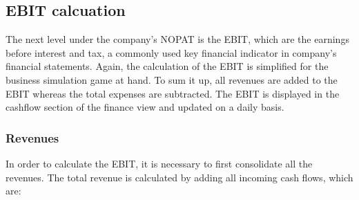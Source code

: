 \subsection{EBIT calcuation}

The next level under the company's NOPAT is the EBIT, which are the earnings before interest and tax, a commonly used key financial indicator in company's financial statements. \cite{lee_e_2006} Again, the calculation of the EBIT is simplified for the business simulation game at hand. To sum it up, all revenues are added to the EBIT whereas the total expenses are subtracted. The EBIT is displayed in the cashflow section of the finance view and updated on a daily basis.

\subsubsection{Revenues}
In order to calculate the EBIT, it is necessary to first consolidate all the revenues. The total revenue is calculated by adding all incoming cash flows, which are:
